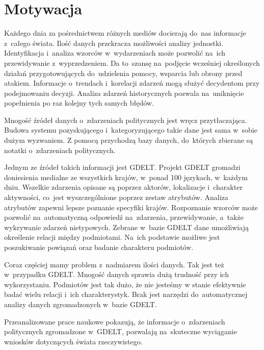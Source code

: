 \documentclass[11pt]{report}
\begin{document}
    \section{Motywacja}\label{sec:motywacja}
    Każdego dnia za pośrednictwem różnych mediów docierają do~nas informacje z~całego świata.
    Ilość danych przekracza możliwości analizy jednostki.
    Identyfikacja i~analiza wzorców w~wydarzeniach może pozwolić na~ich przewidywanie z~wyprzedzeniem.
    Da to~szansę na~podjęcie wcześniej określonych działań przygotowujących do~udzielenia pomocy, wsparcia lub obrony przed atakiem.
    Informacje o~trendach i~korelacji zdarzeń mogą służyć decydentom przy podejmowaniu decyzji.
    Analiza zdarzeń historycznych pozwala na~uniknięcie popełnienia po raz kolejny tych samych błędów.

    Mnogość źródeł danych o~zdarzeniach politycznych jest wręcz przytłaczająca.
    Budowa systemu pozyskującego i~kategoryzującego takie dane jest sama w~sobie dużym wyzwaniem.
    Z pomocą przychodzą bazy danych, do~których zbierane są notatki o~zdarzeniach politycznych.


    Jednym ze źródeł takich informacji jest GDELT\@.
    Projekt GDELT gromadzi doniesienia medialne ze wszystkich krajów, w~ponad 100 językach, w~każdym dniu.
    Wszelkie zdarzenia opisane są poprzez aktorów, lokalizacje i~charakter aktywności, co~jest wyszczególnione poprzez zestaw atrybutów.
    Analiza atrybutów zapewni lepsze poznanie specyfiki krajów.
    Rozpoznanie wzorców może pozwolić na~automatyczną odpowiedź na~zdarzenia, przewidywanie, a~także wykrywanie zdarzeń nietypowych.
    Zebrane w~bazie GDELT dane umożliwiają określenie relacji między podmiotami.
    Na~ich podstawie możliwe jest poszukiwanie powiązań oraz badanie charakteru podmiotów.

    Coraz częściej mamy problem z~nadmiarem ilości danych.
    Tak jest też w~przypadku GDELT\@.
    Mnogość danych sprawia dużą trudność przy ich wykorzystaniu.
    Podmiotów jest tak dużo, że nie jesteśmy w stanie efektywnie badać wielu relacji i~ich charakterystyk.
    Brak jest narzędzi do~automatycznej analizy danych zgromadzonych w~bazie GDELT\@.

    Przeanalizowane prace naukowe pokazują, że informacje o~zdarzeniach politycznych zgromadzone w~GDELT,
    pozwalają na~skuteczne wyciąganie wniosków dotyczących świata rzeczywistego.
\end{document}
